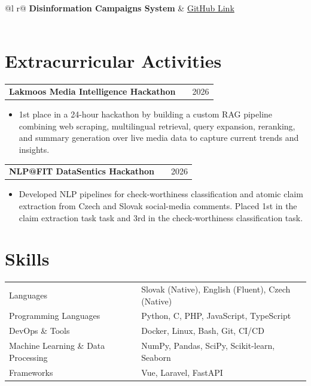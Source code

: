 \documentclass[a4paper,12pt]{article}
\makeatletter
\newenvironment{joblong}[2]
    {
    \begin{tabularx}{\linewidth}{@{}l X r@{}}
    \textbf{#1} & \hfill &  #2 \\[3.75pt]
    \end{tabularx}
    \begin{minipage}[t]{\linewidth}
    \begin{itemize}[nosep,after=\strut, leftmargin=1em, itemsep=3pt,label=--]
    }
    {
    \end{itemize}
    \end{minipage}    
    }
\makeatother
\begin{document}
\vspace{8pt}
\begin{tabularx}{\linewidth}{ @{}l r@{} }
\textbf{Disinformation Campaigns System} & \hfill \href{https://github.com/matusmihaljevic/butfit-iis}{GitHub Link} \\[3.75pt]
  \\
\end{tabularx}

\section{Extracurricular Activities}

\begin{joblong}{Lakmoos Media Intelligence Hackathon}{2026}
    \item 1st place in a 24-hour hackathon by building a custom RAG pipeline combining web scraping, multilingual retrieval, query expansion, reranking, and summary generation over live media data to capture current trends and insights.
\end{joblong}

\begin{joblong}{NLP@FIT DataSentics Hackathon}{2026}
    \item Developed NLP pipelines for check-worthiness classification and atomic claim extraction from Czech and Slovak social-media comments. Placed 1st in the claim extraction task task and 3rd in the check-worthiness classification task.
\end{joblong}

\section{Skills}
\begin{tabularx}{\linewidth}{@{}l X@{}}
Languages &  Slovak (Native), English (Fluent), Czech (Native) \\
Programming Languages &  \normalsize{Python, C, PHP, JavaScript, TypeScript}\\
DevOps \& Tools &  \normalsize{Docker, Linux, Bash, Git, CI/CD}\\
Machine Learning \& Data Processing &  \normalsize{NumPy, Pandas, SciPy, Scikit-learn, Seaborn}\\
Frameworks &  \normalsize{Vue, Laravel, FastAPI}\\
\end{tabularx}

\vfill
{}
\end{document}
